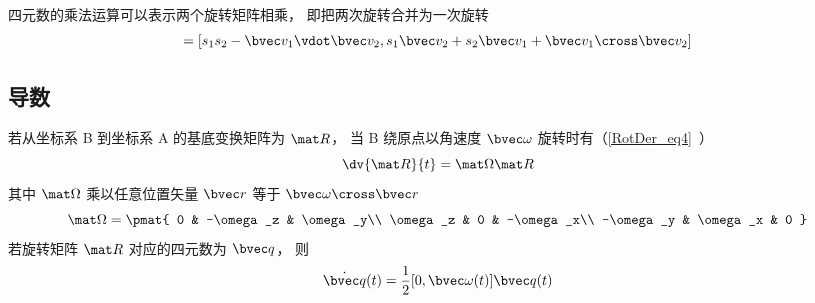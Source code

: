 四元数的乘法运算可以表示两个旋转矩阵相乘， 即把两次旋转合并为一次旋转
\begin{equation}
[s_1, \bvec v_1] [s_2, \bvec v_2] = [s_1 s_2 - \bvec v_1 \vdot \bvec v_2, s_1 \bvec v_2 + s_2 \bvec v_1 + \bvec v_1 \cross \bvec v_2]
\end{equation}

\subsection{导数}
若从坐标系 B 到坐标系 A 的基底变换矩阵为 $\mat R$， 当 B 绕原点以角速度 $\bvec \omega$ 旋转时有（\autoref{RotDer_eq4}~）
\begin{equation}
\dv{\mat R}{t} = \mat \Omega \mat R
\end{equation}
其中 $\mat\Omega$ 乘以任意位置矢量 $\bvec r$ 等于 $\bvec \omega \cross \bvec r$
\begin{equation}
\mat \Omega = \pmat{
0 & -\omega_z & \omega_y\\
\omega_z & 0 & -\omega_x\\
-\omega_y & \omega_x & 0
}\end{equation}
若旋转矩阵 $\mat R$ 对应的四元数为 $\bvec q$， 则
\begin{equation}\label{QuatN_eq1}
\dot {\bvec q}(t) = \frac12 [0, \bvec \omega(t)] \bvec q(t)
\end{equation}

